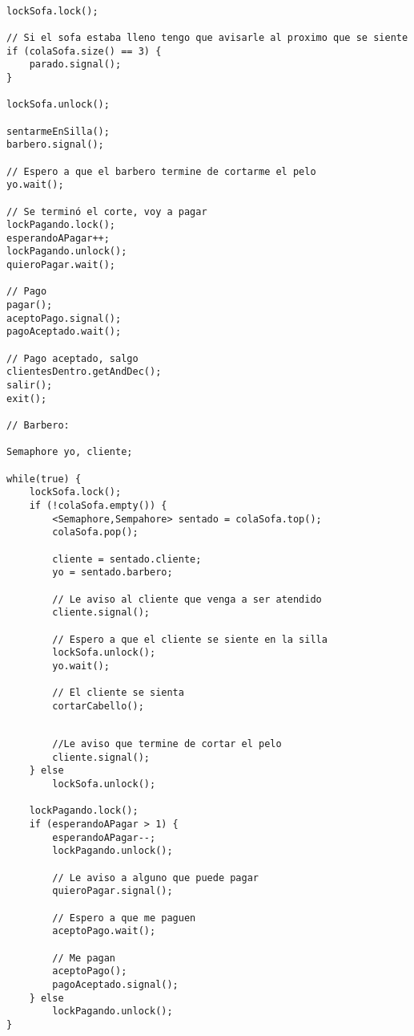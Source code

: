 \begin{codesnippet}
\begin{verbatim}

lockSofa.lock();

// Si el sofa estaba lleno tengo que avisarle al proximo que se siente
if (colaSofa.size() == 3) {
    parado.signal();
}

lockSofa.unlock();

sentarmeEnSilla();
barbero.signal();

// Espero a que el barbero termine de cortarme el pelo
yo.wait();

// Se terminó el corte, voy a pagar
lockPagando.lock();
esperandoAPagar++;
lockPagando.unlock();
quieroPagar.wait();

// Pago
pagar();
aceptoPago.signal();
pagoAceptado.wait();

// Pago aceptado, salgo
clientesDentro.getAndDec();
salir();
exit();

// Barbero:

Semaphore yo, cliente;

while(true) {
    lockSofa.lock();
    if (!colaSofa.empty()) {
        <Semaphore,Sempahore> sentado = colaSofa.top();
        colaSofa.pop();

        cliente = sentado.cliente;
        yo = sentado.barbero;

        // Le aviso al cliente que venga a ser atendido
        cliente.signal();

        // Espero a que el cliente se siente en la silla
        lockSofa.unlock();
        yo.wait();

        // El cliente se sienta
        cortarCabello();

\end{verbatim}
\end{codesnippet}

\begin{codesnippet}
\begin{verbatim}

        //Le aviso que termine de cortar el pelo
        cliente.signal();
    } else
        lockSofa.unlock();

    lockPagando.lock();
    if (esperandoAPagar > 1) {
        esperandoAPagar--;
        lockPagando.unlock();

        // Le aviso a alguno que puede pagar
        quieroPagar.signal();

        // Espero a que me paguen
        aceptoPago.wait();

        // Me pagan
        aceptoPago();
        pagoAceptado.signal();
    } else
        lockPagando.unlock();
}
\end{verbatim}
\end{codesnippet}

